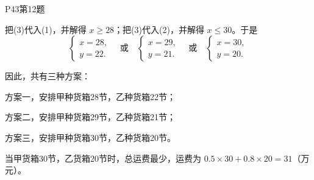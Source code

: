 \documentclass[12pt,aspectratio=169,t,fleqn]{beamer}
\begin{document}
\begin{frame}{P43第12题}
	\begin{solution}[接上页]
		\upshape
		把(3)代入(1)，并解得 $x\ge 28$；把(3)代入(2)，并解得 $x\le 30$。于是
		\[
		\begin{cases}
			x=28,\\
			y=22.
		\end{cases}
		\quad\text{或}\quad
		\begin{cases}
			x=29,\\
			y=21.
		\end{cases}
		\quad\text{或}\quad
		\begin{cases}
			x=30,\\
			y=20.
		\end{cases}
		\]
		
		因此，共有三种方案：
		
		方案一，安排甲种货箱28节，乙种货箱22节；
		
		方案二，安排甲种货箱29节，乙种货箱21节；
		
		方案三，安排甲种货箱30节，乙种货箱20节。
		
		当甲货箱30节，乙货箱20节时，总运费最少，运费为 $0.5\times 30+0.8\times 20=31$（万元）。
	\end{solution}
\end{frame}
\end{document}
